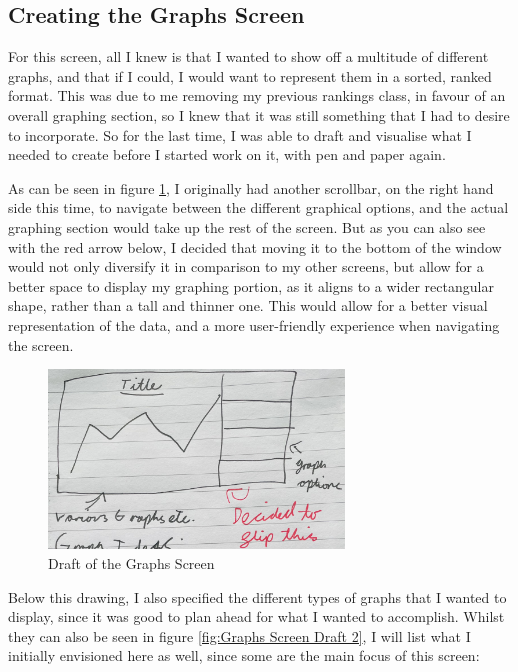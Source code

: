 \documentclass{article}
\begin{document}
\subsection{Creating the Graphs Screen}
For this screen, all I knew is that I wanted to show off a multitude of different graphs, and that if I could, I would want to represent them in a sorted, ranked format. This was due to me removing my previous rankings class, in favour of an overall graphing section, so I knew that it was still something that I had to desire to incorporate. So for the last time, I was able to draft and visualise what I needed to create before I started work on it, with pen and paper again.\\\vspace{0.3cm}

As can be seen in figure \ref{fig:Graphs Screen Draft}, I originally had another scrollbar, on the right hand side this time, to navigate between the different graphical options, and the actual graphing section would take up the rest of the screen. But as you can also see with the red arrow below, I decided that moving it to the bottom of the window would not only diversify it in comparison to my other screens, but allow for a better space to display my graphing portion, as it aligns to a wider rectangular shape, rather than a tall and thinner one. This would allow for a better visual representation of the data, and a more user-friendly experience when navigating the screen.\\\vspace{0.3cm}

\begin{figure}[h]
  \centering
  \includegraphics[width=0.7\textwidth]{Images/Term 2 Images/IMG_1349.jpg}
  \caption{Draft of the Graphs Screen}
  \label{fig:Graphs Screen Draft}
\end{figure}

\vspace{0.3cm}
Below this drawing, I also specified the different types of graphs that I wanted to display, since it was good to plan ahead for what I wanted to accomplish. Whilst they can also be seen in figure \ref{fig:Graphs Screen Draft 2}, I will list what I initially envisioned here as well, since some are the main focus of this screen:
\end{document}

